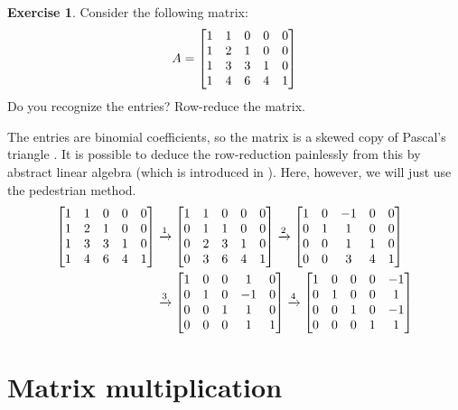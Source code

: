 \documentclass[a4paper]{book}
\theoremstyle{definition}
\newtheorem{exercise}[theorem]{Exercise}
\renewenvironment{solution}{\SolutionInline}{\endSolutionInline}
\begin{document}
\begin{exercise}
 Consider the following matrix:
 \[ A = \begin{bmatrix}
          1 & 1 & 0 & 0 & 0 \\
          1 & 2 & 1 & 0 & 0 \\
          1 & 3 & 3 & 1 & 0 \\
          1 & 4 & 6 & 4 & 1
        \end{bmatrix}
 \]
 Do you recognize the entries?  Row-reduce the matrix.
\end{exercise}
\begin{solution}
 The entries are binomial coefficients, so the matrix is a skewed copy
 of Pascal's triangle .  It is possible to
 deduce the row-reduction painlessly from this by abstract linear
 algebra (which is introduced in ).  Here, however, we will
 just use the pedestrian method.
 \begin{align*}
  \begin{bmatrix} 1&1&0&0&0 \\ 1&2&1&0&0 \\ 1&3&3&1&0 \\ 1&4&6&4&1 \end{bmatrix}
   & \xrightarrow{1}
  \begin{bmatrix} 1&1&0&0&0 \\ 0&1&1&0&0 \\ 0&2&3&1&0 \\ 0&3&6&4&1 \end{bmatrix}
     \xrightarrow{2}
  \begin{bmatrix} 1&0&-1&0&0 \\ 0&1&1&0&0 \\ 0&0&1&1&0 \\ 0&0&3&4&1 \end{bmatrix} \\
   & \xrightarrow{3}
  \begin{bmatrix} 1&0&0&1&0 \\ 0&1&0&-1&0 \\ 0&0&1&1&0 \\ 0&0&0&1&1 \end{bmatrix}
     \xrightarrow{4}
  \begin{bmatrix} 1&0&0&0&-1 \\ 0&1&0&0&1 \\ 0&0&1&0&-1 \\ 0&0&0&1&1 \end{bmatrix}
 \end{align*}
\end{solution}


\section{Matrix multiplication}
\label{sec-mat-mult}
\end{document}
